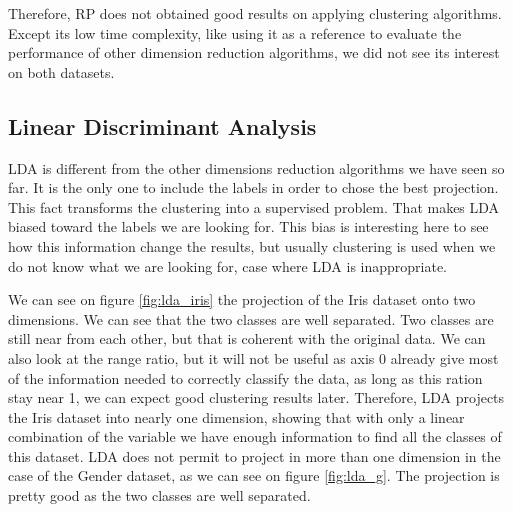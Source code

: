 \documentclass[twocolumn, 10pt]{article}
\begin{document}
			Therefore, RP does not obtained good results on applying clustering algorithms. Except its low time complexity, like using it as a reference to evaluate the performance of other dimension reduction algorithms, we did not see its interest on both datasets.
		\subsection{Linear Discriminant Analysis}
			LDA is different from the other dimensions reduction algorithms we have seen so far. It is the only one to include the labels in order to chose the best projection. This fact transforms the clustering into a supervised problem. That makes LDA biased toward the labels we are looking for. This bias is interesting here to see how this information change the results, but usually clustering is used when we do not know what we are looking for, case where LDA is inappropriate.

			We can see on figure \ref{fig:lda_iris} the projection of the Iris dataset onto two dimensions. We can see that the two classes are well separated. Two classes are still near from each other, but that is coherent with the original data. We can also look at the range ratio, but it will not be useful as axis 0 already give most of the information needed to correctly classify the data, as long as this ration stay near 1, we can expect good clustering results later. Therefore, LDA projects the Iris dataset into nearly one dimension, showing that with only a linear combination of the variable we have enough information to find all the classes of this dataset. LDA does not permit to project in more than one dimension in the case of the Gender dataset, as we can see on figure \ref{fig:lda_g}. The projection is pretty good as the two classes are well separated.
\end{document}
